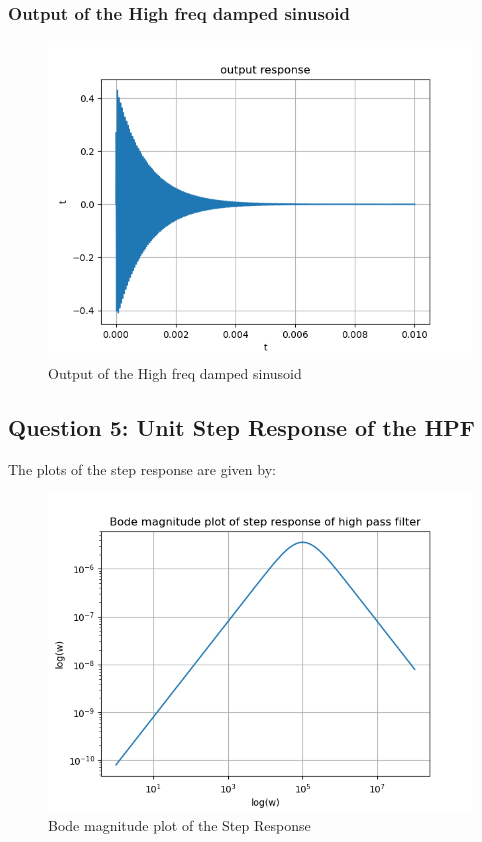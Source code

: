 \documentclass[11pt]{article}
\begin{document}
\subsubsection{Output of the High freq damped sinusoid}
\begin{figure}[H]
    \centering
    \includegraphics[scale = 1]{Figure_9.png}
    \caption{Output of the High freq damped sinusoid}
\end{figure}

\subsection{Question 5: Unit Step Response of the HPF}
The plots of the step response are given by:

\begin{figure}[H]
    \centering
    \includegraphics[scale = 1]{Figure_10.png}
    \caption{Bode magnitude plot of the Step Response}
\end{figure}
\end{document}
